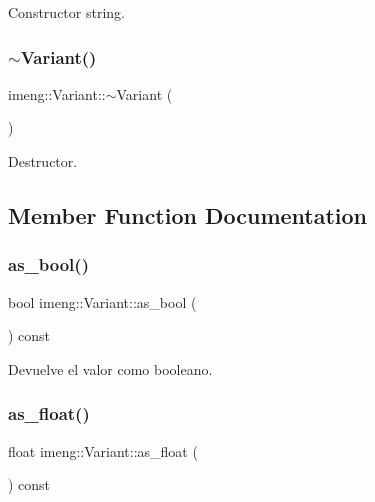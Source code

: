 Constructor string. 

\mbox{\label{classimeng_1_1_variant_a4fff278fc6d4c097a8d17c9deb0fcbbc}} 
\subsubsection{$\sim$Variant()}
{\footnotesize\ttfamily imeng\+::\+Variant\+::$\sim$\+Variant (\begin{DoxyParamCaption}{ }\end{DoxyParamCaption})\hspace{0.3cm}{\ttfamily [inline]}}



Destructor. 



\subsection{Member Function Documentation}
\mbox{\label{classimeng_1_1_variant_a01b0600ef69baf12f1fda0e2076c1727}} 
\subsubsection{as\_bool()}
{\footnotesize\ttfamily bool imeng\+::\+Variant\+::as\+\_\+bool (\begin{DoxyParamCaption}{ }\end{DoxyParamCaption}) const\hspace{0.3cm}{\ttfamily [inline]}}



Devuelve el valor como booleano. 

\mbox{\label{classimeng_1_1_variant_acc226da30d53eb7197a2d0100080869a}} 
\subsubsection{as\_float()}
{\footnotesize\ttfamily float imeng\+::\+Variant\+::as\+\_\+float (\begin{DoxyParamCaption}{ }\end{DoxyParamCaption}) const\hspace{0.3cm}{\ttfamily [inline]}}



